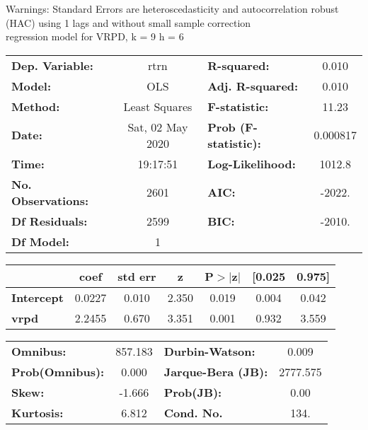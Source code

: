 Warnings: \newline
 [1] Standard Errors are heteroscedasticity and autocorrelation robust (HAC) using 1 lags and without small sample correction\\ 

regression model for VRPD, k = 9 h = 6\begin{center}
\begin{tabular}{lclc}
\toprule
\textbf{Dep. Variable:}    &       rtrn       & \textbf{  R-squared:         } &     0.010   \\
\textbf{Model:}            &       OLS        & \textbf{  Adj. R-squared:    } &     0.010   \\
\textbf{Method:}           &  Least Squares   & \textbf{  F-statistic:       } &     11.23   \\
\textbf{Date:}             & Sat, 02 May 2020 & \textbf{  Prob (F-statistic):} &  0.000817   \\
\textbf{Time:}             &     19:17:51     & \textbf{  Log-Likelihood:    } &    1012.8   \\
\textbf{No. Observations:} &        2601      & \textbf{  AIC:               } &    -2022.   \\
\textbf{Df Residuals:}     &        2599      & \textbf{  BIC:               } &    -2010.   \\
\textbf{Df Model:}         &           1      & \textbf{                     } &             \\
\bottomrule
\end{tabular}
\begin{tabular}{lcccccc}
                   & \textbf{coef} & \textbf{std err} & \textbf{z} & \textbf{P$> |$z$|$} & \textbf{[0.025} & \textbf{0.975]}  \\
\midrule
\textbf{Intercept} &       0.0227  &        0.010     &     2.350  &         0.019        &        0.004    &        0.042     \\
\textbf{vrpd}      &       2.2455  &        0.670     &     3.351  &         0.001        &        0.932    &        3.559     \\
\bottomrule
\end{tabular}
\begin{tabular}{lclc}
\textbf{Omnibus:}       & 857.183 & \textbf{  Durbin-Watson:     } &    0.009  \\
\textbf{Prob(Omnibus):} &   0.000 & \textbf{  Jarque-Bera (JB):  } & 2777.575  \\
\textbf{Skew:}          &  -1.666 & \textbf{  Prob(JB):          } &     0.00  \\
\textbf{Kurtosis:}      &   6.812 & \textbf{  Cond. No.          } &     134.  \\
\bottomrule
\end{tabular}
\end{center}


